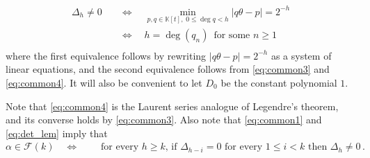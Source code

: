 \documentclass[a4paper,12pt]{article}
\newtheorem*{thm*}{Theorem}
\def\fq{\bbk}
\def\fqt{\fq[t]}
\def\fttt{\fq\!\left(\!\left(t^{-1}\right)\!\right)}
\def\defeq{:=}
\def\bbk{\mathbb{K}}
\def\calf{\mathcal{F}}
\def\defeq{:=}
\newcommand{\HankelPolynomial}{D}
\newcommand{\HankelDeterminant}{\Delta}
\newcommand {\ignore}[1]  {}
\begin{document}
\begin{enumerate}
\begin{equation}
    \begin{aligned}
        \HankelDeterminant_h\ne 0 
        \quad & \iff \quad \min_{p,q\in\fqt,\;0\leq\deg q<h} | q\theta - p |=2^{-h}  \\
        & \iff \quad 
        h=\deg(q_n) \,\textrm{ for some $n\geq1$}\,\\
    \end{aligned}
\end{equation}
where the first equivalence follows by rewriting $| q\theta - p |=2^{-h}$ as a system of linear equations, and the second equivalence follows from \eqref{eq:common3} and \eqref{eq:common4}.
It will also be convenient to let $D_0$ be the constant polynomial $1$.
\end{enumerate}

Note that \eqref{eq:common4} is the Laurent series analogue of Legendre's theorem, and its converse holds by \eqref{eq:common3}. Also note that \eqref{eq:common1} and \eqref{eq:det_lem} imply that
\begin{equation}\label{eq:913}
    \alpha\in\calf(k) \quad\iff\quad \begin{aligned}
        &\textrm{for every $h\geq k$, if $\HankelDeterminant_{h-i}=0$ for every $1\leq i< k$ then $\HankelDeterminant_{h}\neq0$}\,.
    \end{aligned}
\end{equation}

\ignore{Equations \eqref{eq:common3} and \eqref{eq:common4} have a nice interpretation in terms of Hankel determinants that we now recall. For every $h\geq1$, let $\HankelPolynomial_h$ be a polynomial with $2h-1$ variables $x_1,\ldots,x_{2h-1}$ which is given by
\begin{equation}\label{eq:tm_hankel}
	\HankelPolynomial_h(x_1,\ldots,x_{2h-1}) \defeq 
	\begin{vmatrix}
		x_{1}&x_{2}&\cdots &x_{h}\\
		x_{2}&\iddots&\iddots&x_{h+1}\\
		\vdots&\iddots&\iddots&\vdots\\
		x_{h}&x_{h+1}&\cdots&x_{2h-1}
	\end{vmatrix}.
\end{equation}
It will also be convenient to let $D_0$ be the constant polynomial $1$.
\begin{thm*}
\label{det_lem}
Let $\alpha\in\fttt$ and $h\geq1$. Then 
$$\HankelPolynomial_h(\alpha_1,\ldots,\alpha_{2h-1})\ne 0 \quad \iff \quad h=\deg(q_n) \,\textrm{ for some $n\geq1$}\,.$$
\end{thm*}}
\end{document}

